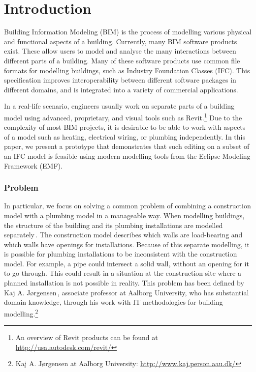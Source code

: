 

\setcounter{page}{1}
\section{Introduction}
Building Information Modeling (BIM) is the process of modelling various physical and functional aspects of a building. Currently, many BIM software products exist. These allow users to model and analyse the many interactions between different parts of a building. Many of these software products use common file formats for modelling buildings, such as Industry Foundation Classes (IFC). This specification improves interoperability between different software packages in different domains, and is integrated into a variety of commercial applications.

In a real-life scenario, engineers usually work on separate parts of a building model using advanced, proprietary, and visual tools such as Revit.\footnote{An overview of Revit products can be found at \url{http://usa.autodesk.com/revit/}} Due to the complexity of most BIM projects, it is desirable to be able to work with aspects of a model such as heating, electrical wiring, or plumbing independently. In this paper, we present a prototype that demonstrates that such editing on a subset of an IFC model is feasible using modern modelling tools from the Eclipse Modeling Framework (EMF).

\subsubsection{Problem}
In particular, we focus on solving a common problem of combining a construction model with a plumbing model in a manageable way. When modelling buildings, the structure of the building and its plumbing installations are modelled separately\,\cite[pp. 19--20]{jorgensen10}. The construction model describes which walls are load-bearing and which walls have openings for installations. Because of this separate modelling, it is possible for plumbing installations to be inconsistent with the construction model. For example, a pipe could intersect a solid wall, without an opening for it to go through. This could result in a situation at the construction site where a planned installation is not possible in reality. This problem has been defined by Kaj A. Jørgensen\,\cite{jorgensen12}, associate professor at Aalborg University, who has substantial domain knowledge, through his work with IT methodologies for building modelling.\footnote{Kaj A. Jørgensen at Aalborg University: \url{http://www.kaj.person.aau.dk/}}

